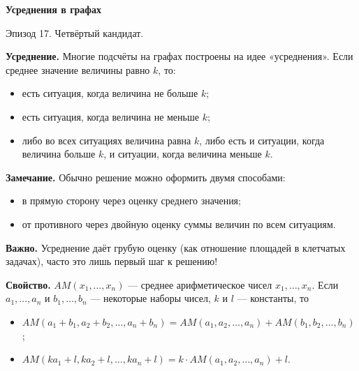 \centerline{\bf \Huge Усреднения в графах}

\begin{flushright}
        \scriptsize{Эпизод 17. Четвёртый кандидат.}
\end{flushright}

\begin{tcolorbox}[
    enhanced,
    breakable,
    colback=gray!10,
    colframe=black!70,
    boxrule=0.6pt,
    arc=2mm
]
\textbf{Усреднение.}
Многие подсчёты на графах построены на идее «усреднения».
Если среднее значение величины равно $k$, то:
\begin{itemize}
    \item есть ситуация, когда величина не больше $k$;
    \item есть ситуация, когда величина не меньше $k$;
    \item либо во всех ситуациях величина равна $k$, либо есть и ситуации, когда величина больше $k$, и ситуации, когда величина меньше $k$.
\end{itemize}
\end{tcolorbox}

\textbf{Замечание.}
Обычно решение можно оформить двумя способами:
\begin{itemize}
    \item в прямую сторону через оценку среднего значения;
    \item от противного через двойную оценку суммы величин по всем ситуациям.
\end{itemize}

\begin{tcolorbox}[
    enhanced,
    breakable,
    colback=gray!10,
    colframe=black!70,
    boxrule=0.6pt,
    arc=2mm
]
\textbf{Важно.}
Усреднение даёт грубую оценку (как отношение площадей в клетчатых задачах), часто это лишь первый шаг к решению!
\end{tcolorbox}

\textbf{Свойство.}
$AM(x_1,\ldots,x_n)$ — среднее арифметическое чисел $x_1,\ldots,x_n$.
Если $a_1,\ldots,a_n$ и $b_1,\ldots,b_n$ — некоторые наборы чисел, $k$ и $l$ — константы, то
\begin{itemize}
    \item $AM(a_1+b_1,a_2+b_2,\ldots,a_n+b_n)=AM(a_1,a_2,\ldots,a_n)+AM(b_1,b_2,\ldots,b_n)$;
    
    \item $AM(ka_1+l,ka_2+l,\ldots,ka_n+l)=k\cdot AM(a_1,a_2,\ldots,a_n)+l$.
\end{itemize}

